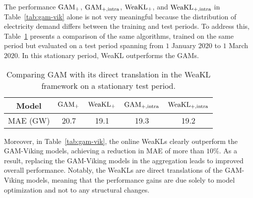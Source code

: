 The performance $\hbox{GAM}_{\mathrm{+}}$, $\hbox{GAM}_{\mathrm{+, intra}}$, $\hbox{WeaKL}_{\mathrm{+}}$, and $\hbox{WeaKL}_{\mathrm{+, intra}}$ in Table~\ref{tab:gam-vik} alone is not very meaningful because the distribution of electricity demand differs between the training and test periods. To address this, Table~\ref{tab:gam-vik-norm} presents a comparison of the same algorithms, trained on the same period but evaluated on a test period spanning from $1$ January $2020$ to $1$ March $2020$. In this stationary period, WeaKL outperforms the GAMs.
\begin{table}
    \centering
    \caption{Comparing GAM with its direct translation in the WeaKL framework on a stationary test period.}
    \begin{tabular}{|c|cccc|}
        \hline
        Model &  $\hbox{GAM}_{\mathrm{+}}$ &  $\hbox{WeaKL}_{\mathrm{+}}$ & $\hbox{GAM}_{+,\mathrm{intra}}$ & $\hbox{WeaKL}_{+,\mathrm{intra}}$\\
        \hline
         MAE (GW) & 20.7 & 19.1 & 19.3 & 19.2\\
         \hline
    \end{tabular}
    \label{tab:gam-vik-norm}
\end{table}

Moreover, in Table~\ref{tab:gam-vik}, the online WeaKLs clearly outperform the GAM-Viking models, achieving a reduction in MAE of more than $10\%$.
As a result, replacing the GAM-Viking models in the aggregation leads to improved overall performance. Notably, the WeaKLs are direct translations of the GAM-Viking models, meaning that the performance gains are due solely to model optimization and not to any structural changes.

